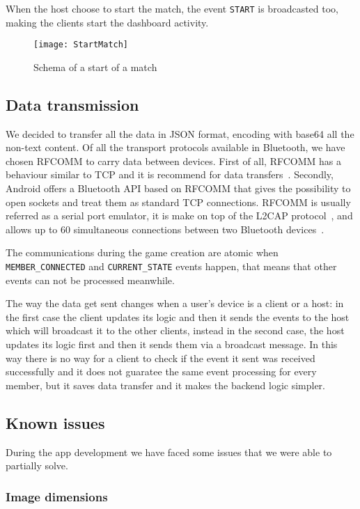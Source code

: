 When the host choose to start the match, the event \texttt{START} is 
broadcasted too, making the clients start the dashboard activity.

\begin{figure}[t]
 \centering
 \texttt{[image: StartMatch]}
 \caption{Schema of a start of a match}
 \label{fig:gbStartMatch}
\end{figure}

\subsection{Data transmission}

We decided to transfer all the data in JSON format, encoding with base64 all the
non-text content.
Of all the transport protocols available in Bluetooth, we have chosen RFCOMM to 
carry data between devices. First of all, RFCOMM has a behaviour similar to TCP 
and it is recommend for data transfers~\cite{bisdikian01}. Secondly, Android 
offers a Bluetooth API based on RFCOMM that gives the possibility to open 
sockets and treat them as standard TCP connections.
RFCOMM is usually referred as a serial port emulator, it is make on top of 
the L2CAP protocol~\cite{bisdikian01}, and allows up to 60 simultaneous 
connections between two Bluetooth devices~\cite{aneesh12}.

The communications during the game creation are atomic when 
\texttt{MEMBER\_CONNECTED} and \texttt{CURRENT\_STATE} events happen, that 
means that other events can not be processed meanwhile.

The way the data get sent changes when a user's device is a client or a 
host: in the first case the client updates its logic and then it sends the 
events to the host which will broadcast it to the other clients, instead in the 
second case, the host updates its logic first and then it sends them via 
a broadcast message. In this way there is no way for a client to check if the 
event it sent was received successfully and it does not guaratee the same event 
processing for every member, but it saves data transfer and it makes the 
backend logic simpler.

\subsection{Known issues}

During the app development we have faced some issues that we were able to 
partially solve.

\subsubsection{Image dimensions}

